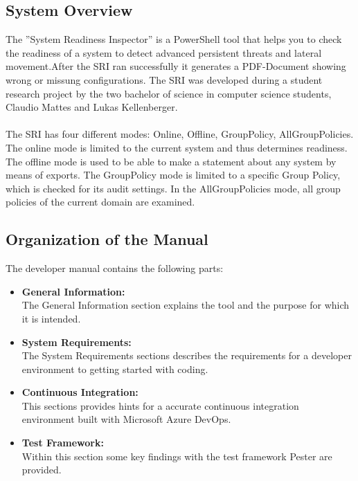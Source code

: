 
 \label{GeneralInfo}
\thispagestyle{plain}
\renewcommand\section{\stdsection}
\setcounter{section}{1}
\subsection{System Overview}
The ''System Readiness Inspector'' is a PowerShell tool that helps you to check the readiness of a system to detect advanced persistent threats and lateral movement.After the SRI ran successfully it generates a PDF-Document showing wrong or missung configurations. The SRI was developed during a student research project by the two bachelor of science in computer science students, Claudio Mattes and Lukas Kellenberger.
\\\\
The SRI has four different modes: Online, Offline, GroupPolicy, AllGroupPolicies. The online mode is limited to the current system and thus determines readiness. The offline mode is used to be able to make a statement about any system by means of exports. The GroupPolicy mode is limited to a specific Group Policy, which is checked for its audit settings. In the AllGroupPolicies mode, all group policies of the current domain are examined.

\subsection{Organization of the Manual}
The developer manual contains the following parts: 
\begin{itemize}
    \item \textbf{General Information:} \ \\
    The General Information section explains the tool and the purpose for which it is intended.
    \item \textbf{System Requirements:} \ \\
    The System Requirements sections describes the requirements for a developer environment to getting started with coding. 
    \item \textbf{Continuous Integration:} \ \\
    This sections provides hints for a accurate continuous integration environment built with Microsoft Azure DevOps.
    \item \textbf{Test Framework:} \ \\
    Within this section some key findings with the test framework Pester are provided.
\end{itemize}


